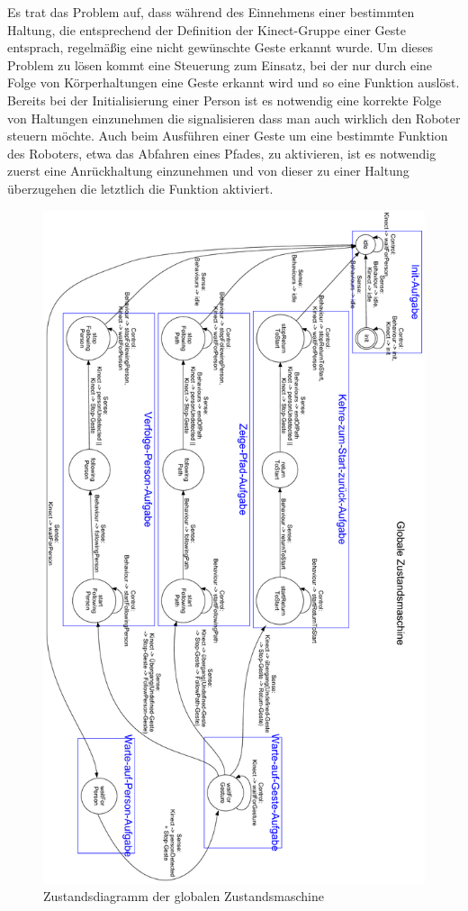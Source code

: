 Es trat das Problem auf, dass während des Einnehmens einer bestimmten Haltung, die entsprechend der Definition 
der Kinect-Gruppe einer Geste entsprach, regelmäßig eine nicht gewünschte Geste erkannt wurde. Um dieses Problem 
zu lösen kommt eine Steuerung zum Einsatz, bei der nur durch eine Folge von Körperhaltungen eine Geste erkannt 
wird und so eine Funktion auslöst. Bereits bei der Initialisierung einer Person ist es notwendig eine korrekte 
Folge von Haltungen einzunehmen die signalisieren dass man auch wirklich den Roboter steuern möchte. Auch beim Ausführen einer Geste um eine bestimmte Funktion des Roboters, etwa das Abfahren eines Pfades, zu aktivieren, ist es notwendig zuerst eine Anrückhaltung einzunehmen und von dieser zu einer Haltung überzugehen die letztlich die 
Funktion aktiviert.

\begin{landscape}
\begin{figure}
	\includegraphics[scale=0.43,angle=90]{graphics/SCHEMA-GlobalStateMachine-hk.pdf}
	\caption{Zustandsdiagramm der globalen Zustandsmaschine}
	\label{fig:integration_statemachine}
\end{figure}
\end{landscape}

